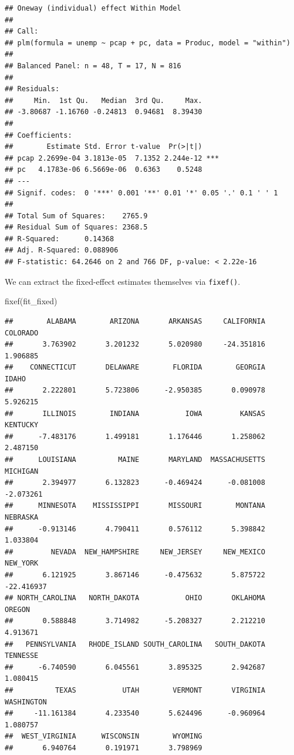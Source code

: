 \documentclass[
  12pt,
  oneside,openany]{book}
\newenvironment{Shaded}{\begin{snugshade}}{\end{snugshade}}
\newcommand{\FunctionTok}[1]{\textcolor[rgb]{0.00,0.00,0.00}{#1}}
\newcommand{\NormalTok}[1]{#1}
\begin{document}
\begin{verbatim}
## Oneway (individual) effect Within Model
## 
## Call:
## plm(formula = unemp ~ pcap + pc, data = Produc, model = "within")
## 
## Balanced Panel: n = 48, T = 17, N = 816
## 
## Residuals:
##     Min.  1st Qu.   Median  3rd Qu.     Max. 
## -3.80687 -1.16760 -0.24813  0.94681  8.39430 
## 
## Coefficients:
##        Estimate Std. Error t-value  Pr(>|t|)    
## pcap 2.2699e-04 3.1813e-05  7.1352 2.244e-12 ***
## pc   4.1783e-06 6.5669e-06  0.6363    0.5248    
## ---
## Signif. codes:  0 '***' 0.001 '**' 0.01 '*' 0.05 '.' 0.1 ' ' 1
## 
## Total Sum of Squares:    2765.9
## Residual Sum of Squares: 2368.5
## R-Squared:      0.14368
## Adj. R-Squared: 0.088906
## F-statistic: 64.2646 on 2 and 766 DF, p-value: < 2.22e-16
\end{verbatim}

We can extract the fixed-effect estimates themselves via \texttt{fixef()}.

\begin{Shaded}
\begin{Highlighting}[]
\FunctionTok{fixef}\NormalTok{(fit\_fixed)}
\end{Highlighting}
\end{Shaded}

\begin{verbatim}
##        ALABAMA        ARIZONA       ARKANSAS     CALIFORNIA       COLORADO 
##       3.763902       3.201232       5.020980     -24.351816       1.906885 
##    CONNECTICUT       DELAWARE        FLORIDA        GEORGIA          IDAHO 
##       2.222801       5.723806      -2.950385       0.090978       5.926215 
##       ILLINOIS        INDIANA           IOWA         KANSAS       KENTUCKY 
##      -7.483176       1.499181       1.176446       1.258062       2.487150 
##      LOUISIANA          MAINE       MARYLAND  MASSACHUSETTS       MICHIGAN 
##       2.394977       6.132823      -0.469424      -0.081008      -2.073261 
##      MINNESOTA    MISSISSIPPI       MISSOURI        MONTANA       NEBRASKA 
##      -0.913146       4.790411       0.576112       5.398842       1.033804 
##         NEVADA  NEW_HAMPSHIRE     NEW_JERSEY     NEW_MEXICO       NEW_YORK 
##       6.121925       3.867146      -0.475632       5.875722     -22.416937 
## NORTH_CAROLINA   NORTH_DAKOTA           OHIO       OKLAHOMA         OREGON 
##       0.588848       3.714982      -5.208327       2.212210       4.913671 
##   PENNSYLVANIA   RHODE_ISLAND SOUTH_CAROLINA   SOUTH_DAKOTA       TENNESSE 
##      -6.740590       6.045561       3.895325       2.942687       1.080415 
##          TEXAS           UTAH        VERMONT       VIRGINIA     WASHINGTON 
##     -11.161384       4.233540       5.624496      -0.960964       1.080757 
##  WEST_VIRGINIA      WISCONSIN        WYOMING 
##       6.940764       0.191971       3.798969
\end{verbatim}
\end{document}
